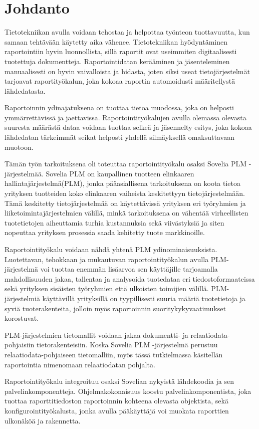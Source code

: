 \chapter{Johdanto} \label{Johdanto}

Tietotekniikan avulla voidaan tehostaa ja helpottaa työnteon tuottavuutta, kun samaan tehtävään käytetty aika vähenee. Tietotekniikan hyödyntäminen raportointiin hyvin luonnollista, sillä raportit ovat useimmiten digitaalisesti tuotettuja dokumentteja. Raportointidatan kerääminen ja jäsenteleminen manuaalisesti on hyvin vaivalloista ja hidasta, joten siksi useat tietojärjestelmät tarjoavat raportityökalun, joka kokoaa raportin automoidusti määritellystä lähdedatasta.

Raportoinnin ydinajatuksena on tuottaa tietoa muodossa, joka on helposti ymmärrettävissä ja jaettavissa. Raportointityökalujen avulla olemassa olevasta suuresta määrästä dataa voidaan tuottaa selkeä ja jäsennelty esitys, joka kokoaa lähdedatan tärkeimmät seikat helposti yhdellä silmäyksellä omaksuttavaan muotoon.

Tämän työn tarkoituksena oli toteuttaa raportointityökalu osaksi Sovelia PLM -järjestelmää. Sovelia PLM on kaupallinen tuotteen elinkaaren hallintajärjestelmä(PLM), jonka pääasiallisena tarkoituksena on koota tietoa yrityksen tuotteiden koko elinkaaren vaiheista keskitettyyn tietojärjestelmään. Tämä keskitetty tietojärjestelmää on käytettävissä yrityksen eri työryhmien ja liiketoimintajärjestelmien välillä, minkä tarkoituksena on vähentää virheellisten tuotetietojen aiheuttamia turhia kustannuksia sekä viivästyksiä ja siten nopeuttaa yrityksen prosessia saada kehitetty tuote markkinoille.

Raportointityökalu voidaan nähdä yhtenä PLM ydinominaisuuksista. Luotettavan, tehokkaan ja mukautuvan raportointityökalun avulla PLM-järjestelmä voi tuottaa enemmän lisäarvoa sen käyttäjille tarjoamalla mahdollisuuden jakaa, tallentaa ja analysoida tuotedataa eri tiedostoformaateissa sekä yrityksen sisäisten työryhmien että ulkoisten toimijien välillä. PLM-järjestelmiä käyttävillä yrityksillä on tyypillisesti suuria määriä tuotetietoja ja syviä tuoterakenteita, jolloin myös raportoinnin suoritykykyvaatimukset korostuvat.

PLM-järjestelmien tietomallit voidaan jakaa dokumentti- ja relaatiodata-pohjaisiin tietorakenteisiin. \cite{david_what_2016} Koska Sovelia PLM -järjestelmä perustuu relaatiodata-pohjaiseen tietomalliin, myös tässä tutkielmassa käsitellän raportointia nimenomaan relaatiodatan pohjalta.

Raportointityökalu integroituu osaksi Sovelian nykyistä lähdekoodia ja sen palvelinkomponentteja. Ohjelmakokonaisuus koostu palvelinkomponentista, joka tuottaa raporttitiedoston raportoinnin kohteena olevasta objektista, sekä konfigurointityökalusta, jonka avulla pääkäyttäjä voi muokata raporttien ulkonäköä ja rakennetta.
